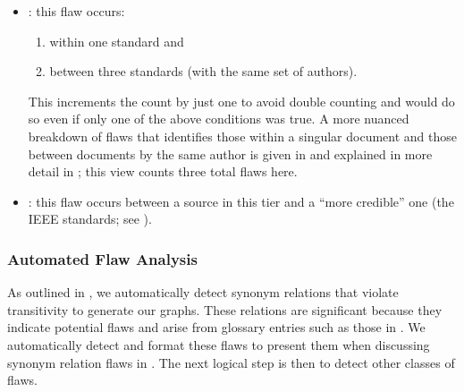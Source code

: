 \begin{itemize}
    \item \textbf{\stds{}}: this flaw occurs:
          \begin{enumerate}
              \item within one standard and
              \item between three standards (with the same set of authors).
          \end{enumerate}
          This increments the count by just one to avoid double counting and
          would do so even if only one of the above conditions was true. A more
          nuanced breakdown of flaws that identifies those within a
          singular document and those between documents by the same author is
          given in  and explained in more detail in
          ; this view counts three total flaws here.
    \item \textbf{\texts{}}: this flaw occurs between a source in this tier and
          a ``more credible'' one (the IEEE standards; see ).
\end{itemize}

\subsubsection{Automated Flaw Analysis}\label{auto-flaw-analysis}

As outlined in , we automatically detect synonym relations
that violate transitivity to generate our graphs. These relations are
significant because they indicate potential flaws and arise from glossary
entries such as those in . We automatically detect
and format these flaws to present them when discussing synonym relation flaws
in . %
The next logical step is then to detect other classes of flaws.

